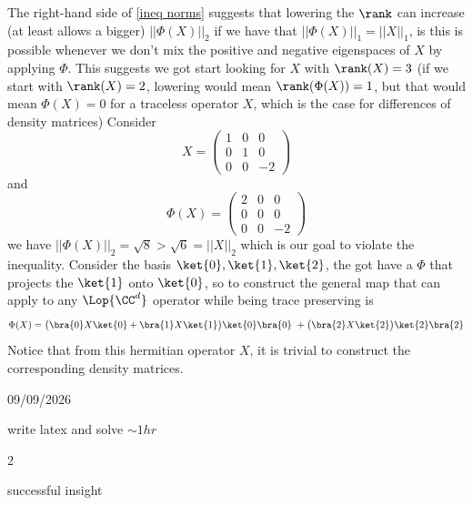 \begin{solution}[Part (b)]
The right-hand side of \eqref{ineq norms} suggests that lowering the $\rank$ can increase (at least allows a bigger) $||\Phi(X)||_2$ if we have that $||\Phi(X)||_1 = ||X||_1$, is this is possible whenever we don't mix the positive and negative eigenspaces of $X$ by applying $\Phi$. This suggests we got start looking for $X$ with $\rank(X)=3$ (if we start with $\rank(X)=2$, lowering would mean $\rank(\Phi(X))=1$, but that would mean $\Phi(X)=0$ for a traceless operator $X$, which is the case for differences of density matrices)
Consider
\begin{equation}
    X= \begin{pmatrix}
        1 & 0 & 0\\
        0 & 1 & 0\\
        0 & 0 & -2
    \end{pmatrix}
\end{equation}
and 
\begin{equation}
    \Phi(X)= \begin{pmatrix}
        2 & 0 & 0\\
        0 & 0 & 0\\
        0 & 0 & -2
    \end{pmatrix}
\end{equation}
we have 
$||\Phi(X)||_2=\sqrt{8}>\sqrt{6}=||X||_2$ which is our goal to violate the inequality.
Consider the basis $\ket{0}, \ket{1},\ket{2}$, the got have a $\Phi$ that projects the $\ket{1}$ onto $\ket{0}$, so to construct the general map that can apply to any $\Lop{\CC^{d}}$ operator while being trace preserving is
\begin{equation}
    \Phi(X)= \big( \bra{0}X\ket{0}+ \bra{1}X\ket{1}\big) \ket{0}\bra{0} \ + \big(  \bra{2}X\ket{2}\big) \ket{2}\bra{2}
\end{equation}
Notice that from this hermitian operator $X$, it is trivial to construct the corresponding density matrices.
\end{solution}




\begin{attemptlog}
  \item[Date] 09/09/2026
  \item[Time taken] write latex and solve $\sim 1 hr$
  \item[Difficulty] 2
  \item[User Opinion] successful insight
\end{attemptlog}
